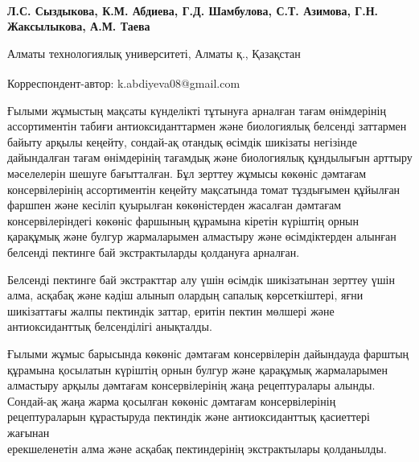 
\begin{articleheader}

{\bfseries
Л.С. Сыздыкова,
К.М. Абдиева\textsuperscript{\envelope },
Г.Д. Шамбулова,
С.Т. Азимова,
Г.Н. Жаксылыкова,
А.М. Таева
}
\end{articleheader}

\begin{affiliation}
Алматы технологиялық университеті, Алматы қ., Қазақстан

\raggedright \textsuperscript{\envelope }Корреспондент-автор: k.abdiyeva08@gmail.com
\end{affiliation}

Ғылыми жұмыстың мақсаты күнделікті тұтынуға арналған тағам өнімдерінің
ассортиментін табиғи антиоксиданттармен және биологиялық белсенді
заттармен байыту арқылы кеңейту, сондай-ақ отандық өсімдік шикізаты
негізінде дайындалған тағам өнімдерінің тағамдық және биологиялық
құндылығын арттыру мәселелерін шешуге бағытталған. Бұл зерттеу жұмысы
көкөніс дәмтағам консервілерінің ассортиментін кеңейту мақсатында томат
тұздығымен құйылған фаршпен және кесіліп қуырылған көкөністерден
жасалған дәмтағам консервілеріндегі көкөніс фаршының құрамына кіретін
күріштің орнын қарақұмық және булгур жармаларымен алмастыру және
өсімдіктерден алынған белсенді пектинге бай экстрактыларды қолдануға
арналған.

Белсенді пектинге бай экстракттар алу үшін өсімдік шикізатынан зерттеу
үшін алма, асқабақ және кәдіш алынып олардың сапалық көрсеткіштері, яғни
шикізаттағы жалпы пектиндік заттар, еритін пектин мөлшері және
антиоксиданттық белсенділігі анықталды.

Ғылыми жұмыс барысында көкөніс дәмтағам консервілерін дайындауда фарштың
құрамына қосылатын күріштің орнын булгур және қарақұмық жармаларымен
алмастыру арқылы дәмтағам консервілерінің жаңа рецептуралары алынды.
Сондай-ақ жаңа жарма қосылған көкөніс дәмтағам консервілерінің
рецептураларын құрастыруда пектиндік және антиоксиданттық қасиеттері
жағынан \\ерекшеленетін алма және асқабақ пектиндерінің экстрактылары
қолданылды.

